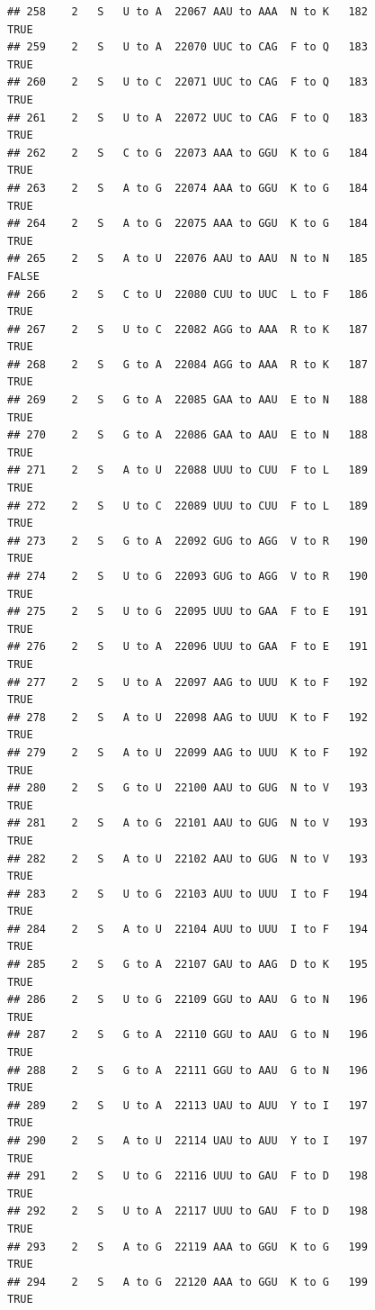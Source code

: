 \documentclass[
  12pt,
]{article}
\begin{document}
\begin{verbatim}
## 258    2   S   U to A  22067 AAU to AAA  N to K   182           TRUE
## 259    2   S   U to A  22070 UUC to CAG  F to Q   183           TRUE
## 260    2   S   U to C  22071 UUC to CAG  F to Q   183           TRUE
## 261    2   S   U to A  22072 UUC to CAG  F to Q   183           TRUE
## 262    2   S   C to G  22073 AAA to GGU  K to G   184           TRUE
## 263    2   S   A to G  22074 AAA to GGU  K to G   184           TRUE
## 264    2   S   A to G  22075 AAA to GGU  K to G   184           TRUE
## 265    2   S   A to U  22076 AAU to AAU  N to N   185          FALSE
## 266    2   S   C to U  22080 CUU to UUC  L to F   186           TRUE
## 267    2   S   U to C  22082 AGG to AAA  R to K   187           TRUE
## 268    2   S   G to A  22084 AGG to AAA  R to K   187           TRUE
## 269    2   S   G to A  22085 GAA to AAU  E to N   188           TRUE
## 270    2   S   G to A  22086 GAA to AAU  E to N   188           TRUE
## 271    2   S   A to U  22088 UUU to CUU  F to L   189           TRUE
## 272    2   S   U to C  22089 UUU to CUU  F to L   189           TRUE
## 273    2   S   G to A  22092 GUG to AGG  V to R   190           TRUE
## 274    2   S   U to G  22093 GUG to AGG  V to R   190           TRUE
## 275    2   S   U to G  22095 UUU to GAA  F to E   191           TRUE
## 276    2   S   U to A  22096 UUU to GAA  F to E   191           TRUE
## 277    2   S   U to A  22097 AAG to UUU  K to F   192           TRUE
## 278    2   S   A to U  22098 AAG to UUU  K to F   192           TRUE
## 279    2   S   A to U  22099 AAG to UUU  K to F   192           TRUE
## 280    2   S   G to U  22100 AAU to GUG  N to V   193           TRUE
## 281    2   S   A to G  22101 AAU to GUG  N to V   193           TRUE
## 282    2   S   A to U  22102 AAU to GUG  N to V   193           TRUE
## 283    2   S   U to G  22103 AUU to UUU  I to F   194           TRUE
## 284    2   S   A to U  22104 AUU to UUU  I to F   194           TRUE
## 285    2   S   G to A  22107 GAU to AAG  D to K   195           TRUE
## 286    2   S   U to G  22109 GGU to AAU  G to N   196           TRUE
## 287    2   S   G to A  22110 GGU to AAU  G to N   196           TRUE
## 288    2   S   G to A  22111 GGU to AAU  G to N   196           TRUE
## 289    2   S   U to A  22113 UAU to AUU  Y to I   197           TRUE
## 290    2   S   A to U  22114 UAU to AUU  Y to I   197           TRUE
## 291    2   S   U to G  22116 UUU to GAU  F to D   198           TRUE
## 292    2   S   U to A  22117 UUU to GAU  F to D   198           TRUE
## 293    2   S   A to G  22119 AAA to GGU  K to G   199           TRUE
## 294    2   S   A to G  22120 AAA to GGU  K to G   199           TRUE

\end{verbatim}
\end{document}
